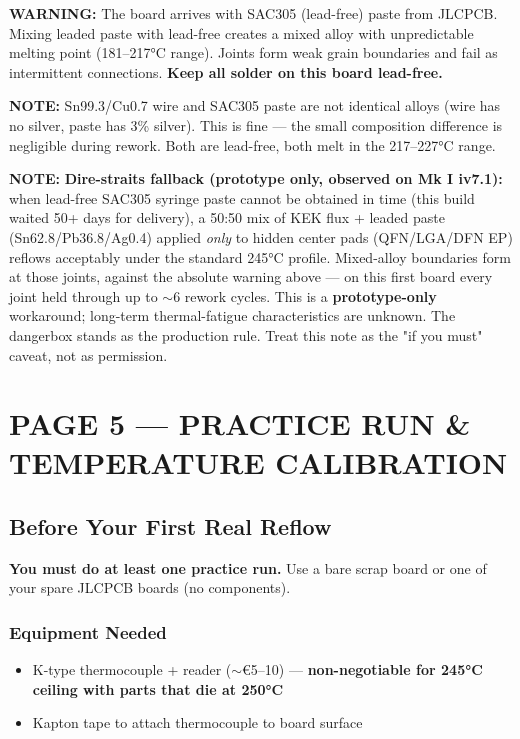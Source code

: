 \documentclass[11pt,a4paper]{article}
\newcommand{\dangerbox}[1]{\par\noindent\colorbox{danger!10}{\parbox{\dimexpr\textwidth-2\fboxsep}{%
\textcolor{danger}{\textbf{WARNING:}} #1}}\par\vspace{0.5em}}
\newcommand{\notebox}[1]{\par\noindent\colorbox{headerblue!8}{\parbox{\dimexpr\textwidth-2\fboxsep}{%
\textcolor{headerblue}{\textbf{NOTE:}} #1}}\par\vspace{0.5em}}
\begin{document}
\dangerbox{The board arrives with SAC305 (lead-free) paste from JLCPCB. Mixing leaded paste with lead-free creates a mixed alloy with unpredictable melting point (181--217°C range). Joints form weak grain boundaries and fail as intermittent connections. \textbf{Keep all solder on this board lead-free.}}

\notebox{Sn99.3/Cu0.7 wire and SAC305 paste are not identical alloys (wire has no silver, paste has 3\% silver). This is fine — the small composition difference is negligible during rework. Both are lead-free, both melt in the 217--227°C range.}

\notebox{\textbf{Dire-straits fallback (prototype only, observed on Mk I iv7.1):} when lead-free SAC305 syringe paste cannot be obtained in time (this build waited 50+ days for delivery), a 50:50 mix of KEK flux + leaded paste (Sn62.8/Pb36.8/Ag0.4) applied \emph{only} to hidden center pads (QFN/LGA/DFN EP) reflows acceptably under the standard 245°C profile. Mixed-alloy boundaries form at those joints, against the absolute warning above --- on this first board every joint held through up to $\sim$6 rework cycles. This is a \textbf{prototype-only} workaround; long-term thermal-fatigue characteristics are unknown. The dangerbox stands as the production rule. Treat this note as the "if you must" caveat, not as permission.}

\newpage
\section*{PAGE 5 — PRACTICE RUN \& TEMPERATURE CALIBRATION}

\subsection*{Before Your First Real Reflow}

\textbf{You must do at least one practice run.} Use a bare scrap board or one of your spare JLCPCB boards (no components).

\subsubsection*{Equipment Needed}
\begin{itemize}[nosep]
\item K-type thermocouple + reader ($\sim$\euro{}5--10) — \textbf{non-negotiable for 245°C ceiling with parts that die at 250°C}
\item Kapton tape to attach thermocouple to board surface
\end{itemize}
\end{document}
